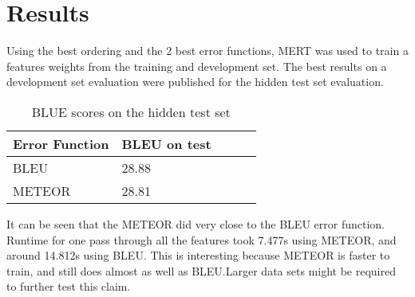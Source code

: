 \documentclass[11pt]{article}
\begin{document}
\section{Results}
Using the best ordering and the 2 best error functions, MERT was used to train a
features weights from the training and development set. The best results on a
development set evaluation were published for the hidden test set evaluation.
 \begin{table}[h]
\begin{center}
\begin{singlespace}
\begin{tabular}{|l|l|l|l|l|}
\hline \bf Error Function &  \bf BLEU on test \\ \hline
BLEU &28.88 \\
METEOR  &28.81 \\
\hline
\end{tabular}
\end{singlespace}
\end{center}
\caption{BLUE scores on the hidden test set}
\end{table}
It can be seen that the METEOR did very close to the BLEU error function. Runtime 
for one pass through all the features took 7.477s using METEOR, and around
14.812s using BLEU.  This is interesting because METEOR is faster to train, and 
still does almost as well as BLEU.Larger data sets might be required to further
test this claim.

{} 
\end{document}
